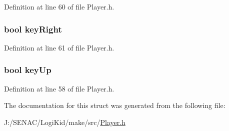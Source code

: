 Definition at line 60 of file Player.\-h.

\hypertarget{struct_keys_ab1642fe3bb4ac9580870ae4d252f997f}{
\subsubsection[{key\-Right}]{\setlength{\rightskip}{0pt plus 5cm}bool key\-Right}}\label{struct_keys_ab1642fe3bb4ac9580870ae4d252f997f}


Definition at line 61 of file Player.\-h.

\hypertarget{struct_keys_a982c240b61e4c6a52ecfccd71c5efcf8}{
\subsubsection[{key\-Up}]{\setlength{\rightskip}{0pt plus 5cm}bool key\-Up}}\label{struct_keys_a982c240b61e4c6a52ecfccd71c5efcf8}


Definition at line 58 of file Player.\-h.



The documentation for this struct was generated from the following file\-:\begin{DoxyCompactItemize}
\item 
J\-:/\-S\-E\-N\-A\-C/\-Logi\-Kid/make/src/\hyperlink{_player_8h}{Player.\-h}\end{DoxyCompactItemize}
